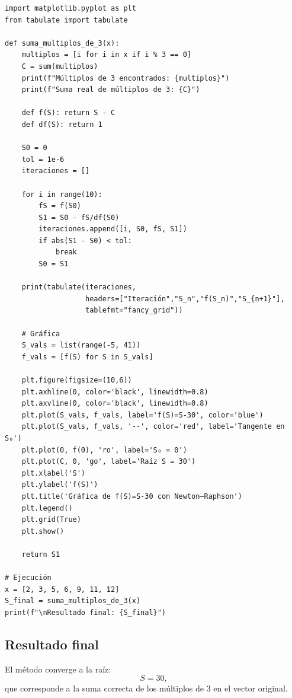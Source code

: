 \documentclass[12pt]{article}
\begin{document}
\begin{tcolorbox}[title=Código Python para sumar múltiplos de 3 con Newton-Raphson,
                  colback=white,
                  colframe=black,
                  breakable,
                  enhanced]
\begin{lstlisting}[style=mypython]
import matplotlib.pyplot as plt
from tabulate import tabulate

def suma_multiplos_de_3(x):
    multiplos = [i for i in x if i % 3 == 0]
    C = sum(multiplos)
    print(f"Múltiplos de 3 encontrados: {multiplos}")
    print(f"Suma real de múltiplos de 3: {C}")

    def f(S): return S - C
    def df(S): return 1

    S0 = 0
    tol = 1e-6
    iteraciones = []

    for i in range(10):
        fS = f(S0)
        S1 = S0 - fS/df(S0)
        iteraciones.append([i, S0, fS, S1])
        if abs(S1 - S0) < tol:
            break
        S0 = S1

    print(tabulate(iteraciones,
                   headers=["Iteración","S_n","f(S_n)","S_{n+1}"],
                   tablefmt="fancy_grid"))

    # Gráfica
    S_vals = list(range(-5, 41))
    f_vals = [f(S) for S in S_vals]

    plt.figure(figsize=(10,6))
    plt.axhline(0, color='black', linewidth=0.8)
    plt.axvline(0, color='black', linewidth=0.8)
    plt.plot(S_vals, f_vals, label='f(S)=S-30', color='blue')
    plt.plot(S_vals, f_vals, '--', color='red', label='Tangente en S₀')
    plt.plot(0, f(0), 'ro', label='S₀ = 0')
    plt.plot(C, 0, 'go', label='Raíz S = 30')
    plt.xlabel('S')
    plt.ylabel('f(S)')
    plt.title('Gráfica de f(S)=S-30 con Newton–Raphson')
    plt.legend()
    plt.grid(True)
    plt.show()

    return S1

# Ejecución
x = [2, 3, 5, 6, 9, 11, 12]
S_final = suma_multiplos_de_3(x)
print(f"\nResultado final: {S_final}")
\end{lstlisting}
\end{tcolorbox}


\subsection*{Resultado final}

El método converge a la raíz:
\[
S = 30,
\]
que corresponde a la suma correcta de los múltiplos de 3 en el vector original.
\end{document}
